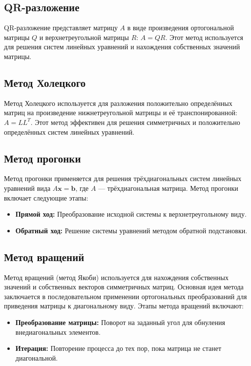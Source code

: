 \documentclass{article}
\begin{document}
\subsection{QR-разложение}
QR-разложение представляет матрицу $A$ в виде произведения ортогональной матрицы $Q$ и верхнетреугольной матрицы $R$: $A = QR$. Этот метод используется для решения систем линейных уравнений и нахождения собственных значений матрицы.

\subsection{Метод Холецкого}
Метод Холецкого используется для разложения положительно определённых матриц на произведение нижнетреугольной матрицы и её транспонированной: $A = LL^T$. Этот метод эффективен для решения симметричных и положительно определённых систем линейных уравнений.

\subsection{Метод прогонки}
Метод прогонки применяется для решения трёхдиагональных систем линейных уравнений вида $A\mathbf{x} = \mathbf{b}$, где $A$ — трёхдиагональная матрица. Метод прогонки включает следующие этапы:
\begin{itemize}
    \item \textbf{Прямой ход:} Преобразование исходной системы к верхнетреугольному виду.
    \item \textbf{Обратный ход:} Решение системы уравнений методом обратной подстановки.
\end{itemize}

\subsection{Метод вращений}
Метод вращений (метод Якоби) используется для нахождения собственных значений и собственных векторов симметричных матриц. Основная идея метода заключается в последовательном применении ортогональных преобразований для приведения матрицы к диагональному виду. Этапы метода вращений включают:
\begin{itemize}
    \item \textbf{Преобразование матрицы:} Поворот на заданный угол для обнуления внедиагональных элементов.
    \item \textbf{Итерация:} Повторение процесса до тех пор, пока матрица не станет диагональной.
\end{itemize}
\end{document}
